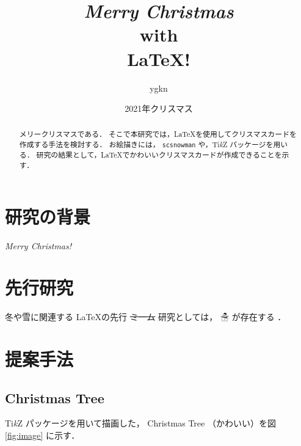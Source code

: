 \documentclass[a5paper, 12pt, uplatex, landscape]{jsarticle}
\title{
{\color{red} \textit{Merry Christmas}} \\
with \\
{\color{green} \LaTeX !}
}
\date{2021年クリスマス}
\author{ygkn}
\begin{document}
\maketitle

\begin{abstract}
  メリークリスマスである．
  そこで本研究では，\LaTeX を使用してクリスマスカードを作成する手法を検討する．
  お絵描きには，
  \texttt{scsnowman} や，Ti\textit{k}Z パッケージを用いる．
  研究の結果として，\LaTeX でかわいいクリスマスカードが作成できることを示す．
\end{abstract}

\twocolumn[
]


\section{研究の背景}

\textit{Merry Christmas!}

\section{先行研究}

冬や雪に関連する \LaTeX の先行 \sout{ミーム} 研究としては，
☃ が存在する \cite{tex-meme} ．

\section{提案手法}


\subsection{Christmas Tree}

Ti\textit{k}Z パッケージを用いて描画した，
Christmas Tree （かわいい）を図 \ref{fig:image} に示す．
\end{document}
